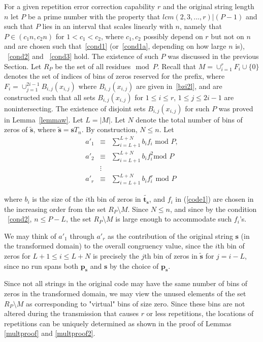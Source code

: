 For a given repetition error correction capability $r$ and the
original string length $n$ let $P$ be a prime number with the
property that $lcm(2,3,...,r)| (P-1)$ and such that $P$ lies in an
interval that scales linearly with $n$, namely that $P \in
(c_1n,c_2n)$ for $1 <c_1 < c_2$, where $c_1,c_2$ possibly depend on
$r$ but not on $n$ and are chosen such that~\eqref{cond1}
(or~\eqref{cond1a}, depending on how large $n$ is), ~\eqref{cond2}
and ~\eqref{cond3} hold. The existence of such $P$ was discussed in
the previous Section. Let $R_P$ be the set of all residues$\mod P$.
Recall that $M=\cup_{i=1}^r F_i \cup \{0\}$ denotes the set of
indices of bins of zeros reserved for the prefix, where $F_i =
\cup_{j=1}^{2i-1} B_{i,j}(x_{i,j})$ where $B_{i,j}(x_{i,j})$ are
given in~\eqref{bzi2l}, and are constructed such that all sets
$B_{i,j}(x_{i,j})$ for $1 \leq i \leq r$, $1 \leq j \leq 2i-1$ are
nonintersecting. The existence of disjoint sets $B_{i,j}(x_{i,j})$
for such $P$ was proved in Lemma~\ref{lemmaw}. Let $L=|M|$. Let $N$
denote the total number of bins of zeros of $\tilde{\mathbf{s}}$,
where $\tilde{\mathbf{s}}=\mathbf{s}T_n$. By construction, $N \leq
n$.
 Let
\begin{equation}\label{code1}\begin{array}{ccc} {a'}_1 &\equiv& \sum_{i=L+1}^{L+N} b_i f_i
\text{ mod } P, \\ {a'}_2 &\equiv& \sum_{i=L+1}^{L+N} b_i f_i^2
\text{
mod } P\\ &\vdots& \\
{a'}_r &\equiv& \sum_{i=L+1}^{L+N} b_i f_i^r \text{ mod }
P\end{array}\end{equation}

where $b_i$ is the size of the $i$th bin of zeros in
$\tilde{\mathbf{t_s}}$, and $f_i$ in (\ref{code1}) are chosen in the
increasing order from the set $R_P\setminus M$. Since $N \leq n$,
and since by the condition ~\eqref{cond2},  $n \leq P-L$, the set
$R_P\setminus M$ is large enough to accommodate such $f_i$'s.

We may think of ${a'}_1$ through ${a'}_r$ as the contribution of the
original string  $\mathbf{s}$ (in the transformed domain) to the
overall congruency value, since the $i$th bin of zeros for $L+1 \leq
i \leq L+N$ is precisely the $j$th bin of zeros in
$\tilde{\mathbf{s}}$ for $j=i-L$, since no run spans both
$\mathbf{p_s}$ and $\mathbf{s}$ by the choice of $\mathbf{p_s}$.

Since not all strings in the original code may have the same number
of bins of zeros in the transformed domain, we may view the unused
elements of the set $R_P \setminus M$ as corresponding to "virtual"
bins of size zero. Since these bins are not altered during the
transmission that causes $r$ or less repetitions, the locations of
repetitions can be uniquely determined as shown in the proof of
Lemmas \ref{multproof} and \ref{multproof2}.


